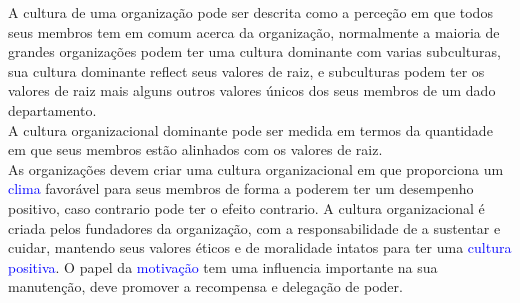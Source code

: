 A cultura de uma organização pode ser descrita como a perceção em que todos seus membros tem em comum acerca da organização, normalmente a maioria de grandes organizações podem ter uma cultura dominante com varias subculturas, sua cultura dominante reflect seus valores de raiz, e subculturas podem ter os valores de raiz mais alguns outros valores únicos dos seus membros de um dado departamento. \\
A cultura organizacional dominante pode ser medida em termos da quantidade em que seus membros estão alinhados com os valores de raiz. \\
As organizações devem criar uma cultura organizacional em que proporciona um \textcolor{blue}{clima} favorável para seus membros de forma a poderem ter um desempenho positivo, caso contrario pode ter o efeito contrario. A cultura organizacional é criada pelos fundadores da organização, com a responsabilidade de a sustentar e cuidar, mantendo seus valores éticos e de moralidade intatos para ter uma \textcolor{blue}{cultura positiva}. O papel da \textcolor{blue}{motivação} tem uma influencia importante na sua manutenção, deve promover a recompensa e delegação de poder.\cite{book_4} \cite{book_2}
\newpage
